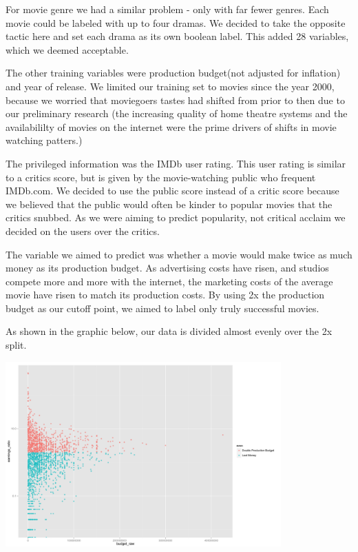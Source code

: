 \documentclass[twoside]{article}\usepackage[]{graphicx}\usepackage[]{color}
\begin{document}
\begin{multicols}{2}
For movie genre we had a similar problem - only with far fewer genres. Each movie
could be labeled with up to four dramas. We decided to take the opposite tactic here
and set each drama as its own boolean label. This added 28 variables, which we deemed
acceptable.

The other training variables were production budget(not adjusted for inflation)
and year of release. We limited our training set to movies since the year 2000, because
we worried that moviegoers tastes had shifted from prior to then due to our preliminary
research (the increasing quality of home theatre systems and the availabililty of
movies on the internet were the prime drivers of shifts in movie watching patters.)

The privileged information was the IMDb user rating. This user rating is similar
to a critics score, but is given by the movie-watching public who frequent IMDb.com.
We decided to use the public score instead of a critic score because we believed
that the public would often be kinder to popular movies that the critics snubbed. As
we were aiming to predict popularity, not critical acclaim we decided on the users over
the critics.

The variable we aimed to predict was whether a movie would make twice as much money
as its production budget. As advertising costs have risen, and studios compete more
and more with the internet, the marketing costs of the average movie have risen to 
match its production costs. By using 2x the production budget as our cutoff point, we
aimed to label only truly successful movies.

As shown in the graphic below, our data is divided almost evenly over the 2x split.
\end{multicols}

\includegraphics[width=400px]{figure/movies.png} 
\end{document}
